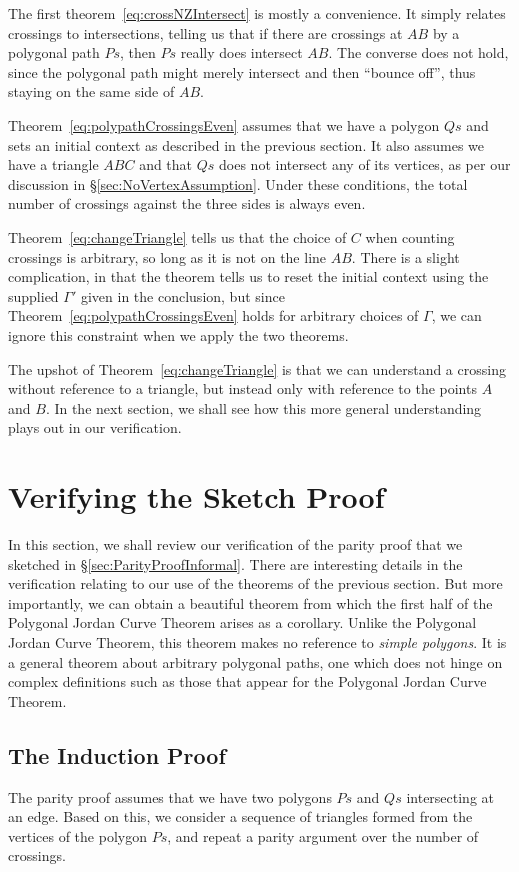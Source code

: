 The first theorem~\eqref{eq:crossNZIntersect} is mostly a convenience. It simply relates crossings to intersections, telling us that if there are crossings at $AB$ by a polygonal path $Ps$, then $Ps$ really does intersect $AB$. The converse does not hold, since the polygonal path might merely intersect and then ``bounce off'', thus staying on the same side of $AB$.

Theorem~\ref{eq:polypathCrossingsEven} assumes that we have a polygon $Qs$ and sets an initial context as described in the previous section. It also assumes we have a triangle $ABC$ and that $Qs$ does not intersect any of its vertices, as per our discussion in \S\ref{sec:NoVertexAssumption}. Under these conditions, the total number of crossings against the three sides is always even.

Theorem~\ref{eq:changeTriangle} tells us that the choice of $C$ when counting crossings is arbitrary, so long as it is not on the line $AB$. There is a slight complication, in that the theorem tells us to reset the initial context using the supplied $\Gamma'$ given in the conclusion, but since Theorem~\ref{eq:polypathCrossingsEven} holds for arbitrary choices of $\Gamma$, we can ignore this constraint when we apply the two theorems.

The upshot of Theorem~\ref{eq:changeTriangle} is that we can understand a crossing without reference to a triangle, but instead only with reference to the points $A$ and $B$. In the next section, we shall see how this more general understanding plays out in our verification.

\section{Verifying the Sketch Proof}
In this section, we shall review our verification of the parity proof that we sketched in \S\ref{sec:ParityProofInformal}. There are interesting details in the verification relating to our use of the theorems of the previous section. But more importantly, we can obtain a beautiful theorem from which the first half of the Polygonal Jordan Curve Theorem arises as a corollary. Unlike the Polygonal Jordan Curve Theorem, this theorem makes no reference to \emph{simple polygons}. It is a general theorem about arbitrary polygonal paths, one which does not hinge on complex definitions such as those that appear for the Polygonal Jordan Curve Theorem.

\subsection{The Induction Proof}\label{sec:InductionProof}
The parity proof assumes that we have two polygons $Ps$ and $Qs$ intersecting at an edge. Based on this, we consider a sequence of triangles formed from the vertices of the polygon $Ps$, and repeat a parity argument over the number of crossings.


